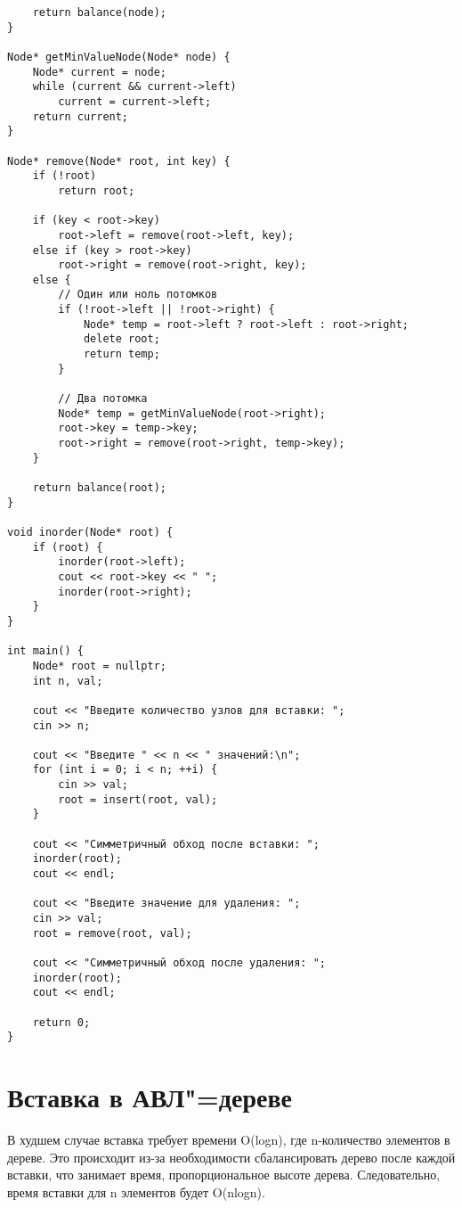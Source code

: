 \documentclass[otchet]{SCWorks}
\begin{document}
\begin{verbatim}
    return balance(node);
}

Node* getMinValueNode(Node* node) {
    Node* current = node;
    while (current && current->left)
        current = current->left;
    return current;
}

Node* remove(Node* root, int key) {
    if (!root)
        return root;

    if (key < root->key)
        root->left = remove(root->left, key);
    else if (key > root->key)
        root->right = remove(root->right, key);
    else {
        // Один или ноль потомков
        if (!root->left || !root->right) {
            Node* temp = root->left ? root->left : root->right;
            delete root;
            return temp;
        }

        // Два потомка
        Node* temp = getMinValueNode(root->right);
        root->key = temp->key;
        root->right = remove(root->right, temp->key);
    }

    return balance(root);
}

void inorder(Node* root) {
    if (root) {
        inorder(root->left);
        cout << root->key << " ";
        inorder(root->right);
    }
}

int main() {
    Node* root = nullptr;
    int n, val;

    cout << "Введите количество узлов для вставки: ";
    cin >> n;

    cout << "Введите " << n << " значений:\n";
    for (int i = 0; i < n; ++i) {
        cin >> val;
        root = insert(root, val);
    }

    cout << "Симметричный обход после вставки: ";
    inorder(root);
    cout << endl;

    cout << "Введите значение для удаления: ";
    cin >> val;
    root = remove(root, val);

    cout << "Симметричный обход после удаления: ";
    inorder(root);
    cout << endl;

    return 0;
}
\end{verbatim}

\section{Вставка в АВЛ"=дереве}
В худшем случае вставка требует времени O(logn), где n-количество элементов в дереве.
Это  происходит из-за необходимости сбалансировать дерево после каждой вставки, что занимает время, пропорциональное высоте дерева.
Следовательно, время вставки для n элементов будет O(nlogn).
\end{document}
